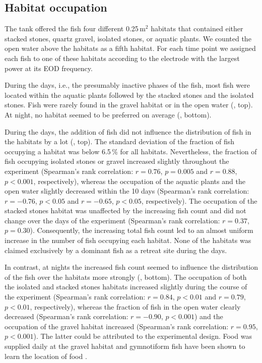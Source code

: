 \subsection{Habitat occupation}
The tank offered the fish four different 0.25\,m$^{2}$ habitats that contained either stacked stones, quartz gravel, isolated stones, or aquatic plants. We counted the open water above the habitats as a fifth habitat. For each time point we assigned each fish to one of
these habitats according to the electrode with the largest power at its EOD frequency.

During the days, i.e., the presumably inactive phases of the fish, most fish were located within the aquatic plants followed by the stacked stones and the isolated stones. Fish were rarely found in the gravel habitat or in the open water (, top). At night, no habitat seemed to be preferred on average (, bottom).

During the days, the addition of fish did not influence the distribution of fish in the habitats by a lot (, top). The standard deviation of the fraction of fish occupying a habitat was below 6.5\,\% for all habitats. Nevertheless, the fraction of fish occupying isolated stones or gravel increased slightly throughout the experiment (Spearman's rank correlation: $r=0.76$, $p=0.005$ and $r=0.88$, $p<0.001$, respectively), whereas the occupation of the aquatic plants and the open water slightly decreased within
the 10 days (Spearman's rank correlation: $r=-0.76$, $p<0.05$ and $r=-0.65$, $p<0.05$, respectively). The occupation of the stacked stones habitat was unaffected by the increasing
fish count and did not change over the days of the experiment (Spearman's rank correlation: $r=0.37$, $p=0.30$). Consequently, the increasing total fish count led to an almost uniform increase in the number of fish occupying each habitat. None of the habitats was claimed exclusively by a dominant fish as a retreat site during the days.

In contrast, at nights the increased fish count seemed to influence the distribution of the fish over the habitats more strongly (, bottom). The occupation of both the isolated and stacked stones habitats increased slightly during the course of the experiment (Spearman's rank correlation: $r=0.84$, $p<0.01$ and $r=0.79$, $p<0.01$, respectively), whereas the fraction of fish in the open water clearly decreased (Spearman's rank correlation: $r=-0.90$, $p<0.001$) and the occupation of the gravel habitat increased (Spearman's rank correlation: $r=0.95$, $p<0.001$). The latter could be attributed to the experimental design. Food was supplied daily at the gravel habitat and gymnotiform fish
have been shown to learn the location of food \citep{Jun2013}.

